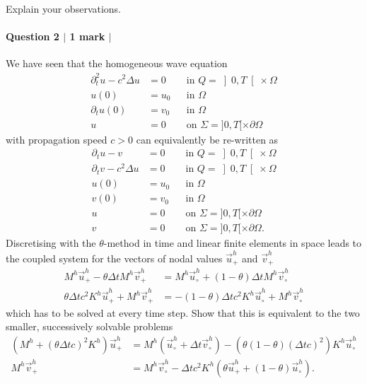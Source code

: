\documentclass[10pt,letterpaper]{scrartcl}
\begin{document}
Explain your observations.

\newpage

\paragraph*{Question 2 $\vert$ 1 mark $\vert$ \faFilePdfO}

We have seen that the homogeneous wave equation
\begin{equation}\tag{W}\label{eq:wave}
\begin{aligned}
\partial_t^2 u - c^2 \Delta u &= 0 && \text{in } Q = \left] 0,T\right[ \times \Omega\\
u(0) &= u_0 && \text{in } \Omega\\
\partial_t u(0) &= v_0 && \text{in } \Omega\\
u &= 0 && \text{on } \Sigma = ]0,T[ \times \partial \Omega
\end{aligned}
\end{equation}
with propagation speed $c>0$ can equivalently be re-written as
\begin{equation}\tag{W'}\label{eq:waveSystem}
\begin{aligned}
\partial_t u - v &= 0 && \text{in } Q = \left] 0,T\right[ \times \Omega\\
\partial_t v - c^2 \Delta u &= 0 && \text{in } Q = \left] 0,T\right[ \times \Omega\\
u(0) &= u_0 && \text{in } \Omega\\
v(0) &= v_0 && \text{in } \Omega\\
u &= 0 && \text{on } \Sigma = ]0,T[ \times \partial \Omega\\
v &= 0 && \text{on } \Sigma = ]0,T[ \times \partial \Omega.
\end{aligned}
\end{equation}
Discretising with the $\theta$-method in time and linear finite elements in space leads to the coupled system for the vectors of nodal values $\vec{u}^h_+$ and $\vec{v}^h_+$
\begin{align*}
M^h \vec{u}^h_+ - \theta \Delta t M^h \vec{v}^h_+ &= M^h \vec{u}^h_\circ + (1-\theta) \Delta t M^h\vec{v}^h_\circ\\
\theta \Delta t c^2 K^h \vec{u}^h_+ + M^h \vec{v}^h_+ &= -(1-\theta) \Delta t c^2 K^h \vec{u}^h_\circ + M^h \vec{v}^h_\circ
\end{align*}
which has to be solved at every time step. Show that this is equivalent to the two smaller, successively solvable problems
\begin{align*}
\left(M^h + \left(\theta \Delta t c\right)^2 K^h\right) \vec{u}^h_+ &= M^h \left( \vec{u}^h_\circ + \Delta t \vec{v}^h_\circ\right) - \left( \theta\left(1-\theta\right) \left(\Delta t c\right)^2 \right)K^h \vec{u}^h_\circ\\
M^h \vec{v}^h_+ &= M^h \vec{v}^h_\circ - \Delta t c^2 K^h \left( \theta \vec{u}^h_+ + \left(1-\theta\right) \vec{u}^h_\circ\right).
\end{align*}
\end{document}

